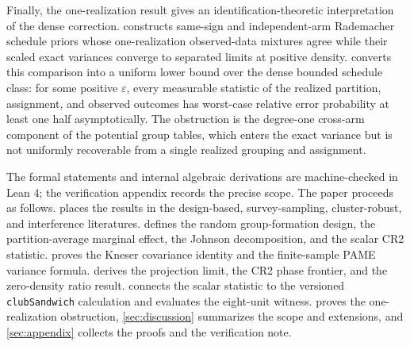 Finally, the one-realization result gives an identification-theoretic interpretation of the dense correction.  constructs same-sign and independent-arm Rademacher schedule priors whose one-realization observed-data mixtures agree while their scaled exact variances converge to separated limits at positive density.  converts this comparison into a uniform lower bound over the dense bounded schedule class: for some positive \(\varepsilon\), every measurable statistic of the realized partition, assignment, and observed outcomes has worst-case relative error probability at least one half asymptotically. The obstruction is the degree-one cross-arm component of the potential group tables, which enters the exact variance but is not uniformly recoverable from a single realized grouping and assignment.

The formal statements and internal algebraic derivations are machine-checked in Lean 4; the verification appendix records the precise scope. The paper proceeds as follows.  places the results in the design-based, survey-sampling, cluster-robust, and interference literatures.  defines the random group-formation design, the partition-average marginal effect, the Johnson decomposition, and the scalar CR2 statistic.  proves the Kneser covariance identity and the finite-sample PAME variance formula.  derives the projection limit, the CR2 phase frontier, and the zero-density ratio result.  connects the scalar statistic to the versioned \texttt{clubSandwich} calculation and evaluates the eight-unit witness.  proves the one-realization obstruction, \cref{sec:discussion} summarizes the scope and extensions, and \cref{sec:appendix} collects the proofs and the verification note.
